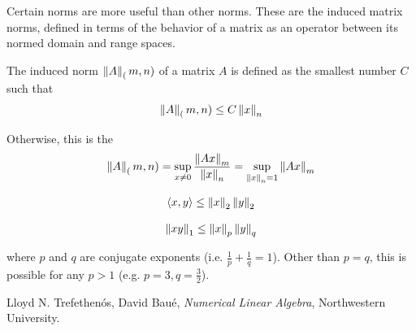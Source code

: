 \documentclass[11pt]{article}
\begin{document}
Certain norms are more useful than other norms. These are the induced matrix norms,
defined in terms of the behavior of a matrix as an operator between its normed domain and 
range spaces.

The induced norm $\left\lVert A\right\rVert_(m, n)$ of a matrix $A$ is defined as the smallest
number $C$ such that
\begin{align*}
  \left\lVert A\right\rVert_(m, n) \leq C \left\lVert x\right\rVert_n
\end{align*}

Otherwise, this is the 
\begin{align*}
  \left\lVert A\right\rVert_(m, n) = \sup_{x \neq 0} \frac{\left\lVert Ax\right\rVert_m}{\left\lVert x\right\rVert_n} = \sup_{\left\lVert x\right\rVert_n = 1} \left\lVert Ax\right\rVert_m
\end{align*}


\begin{align*}
  \langle x, y \rangle \leq \left\lVert x\right\rVert_2 \left\lVert y\right\rVert_2
\end{align*}

\begin{align*}
  \left\lVert xy\right\rVert_1 \leq \left\lVert x\right\rVert_p \left\lVert y\right\rVert_q
\end{align*}

where $p$ and $q$ are conjugate exponents (i.e. $\frac{1}{p} + \frac{1}{q} = 1$). Other than $p=q$, this is possible for any $p>1$ (e.g. $p=3, q=\tfrac{3}{2}$).



%


\begin{thebibliography}{77}

Lloyd N. Trefethen\'{o}s, David Bau\'{e},
\emph{Numerical Linear Algebra},
Northwestern University.

\end{thebibliography}
\end{document}
